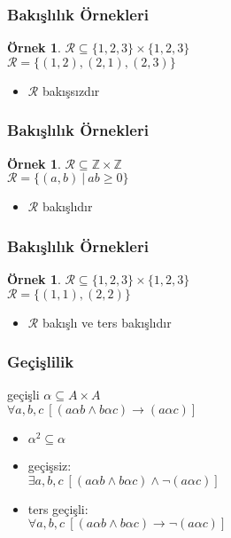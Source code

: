 \documentclass[dvipsnames]{beamer}
\theoremstyle{definition}
\theoremstyle{example}
\newtheorem{ornek}[theorem]{Örnek}
\theoremstyle{plain}
\begin{document}
\begin{frame}
  \frametitle{Bakışlılık Örnekleri}

  \begin{ornek}
    $\mathcal{R} \subseteq \{1,2,3\} \times \{1,2,3\}$\\
    $\mathcal{R} = \{(1,2), (2,1), (2,3)\}$

    \medskip
    \begin{itemize}
      \item $\mathcal{R}$ bakışsızdır
    \end{itemize}
  \end{ornek}
\end{frame}

\begin{frame}
  \frametitle{Bakışlılık Örnekleri}

  \begin{ornek}
    $\mathcal{R} \subseteq \mathbb{Z} \times \mathbb{Z}$\\
    $\mathcal{R} = \{(a,b)~|~ab \geq 0\}$

    \medskip
    \begin{itemize}
      \item $\mathcal{R}$ bakışlıdır
    \end{itemize}
  \end{ornek}
\end{frame}

\begin{frame}
  \frametitle{Bakışlılık Örnekleri}

  \begin{ornek}
    $\mathcal{R} \subseteq \{1,2,3\} \times \{1,2,3\}$\\
    $\mathcal{R} = \{(1,1), (2,2)\}$

    \begin{itemize}
      \item $\mathcal{R}$ bakışlı ve ters bakışlıdır
    \end{itemize}
  \end{ornek}
\end{frame}

\begin{frame}
  \frametitle{Geçişlilik}

  \begin{block}{geçişli}
    $\alpha \subseteq A \times A$\\
    $\forall a,b,c~[(a \alpha b \wedge b \alpha c) \rightarrow (a \alpha c)]$
  \end{block}

  \pause
  \begin{itemize}
    \item $\alpha^2 \subseteq \alpha$

    \pause
    \item geçişsiz:\\
      $\exists a,b,c~[(a \alpha b \wedge b \alpha c) \wedge \neg (a \alpha c)]$

    \pause
    \item ters geçişli:\\
      $\forall a,b,c~[(a \alpha b \wedge b \alpha c) \rightarrow \neg (a \alpha c)]$
  \end{itemize}
\end{frame}
\end{document}
